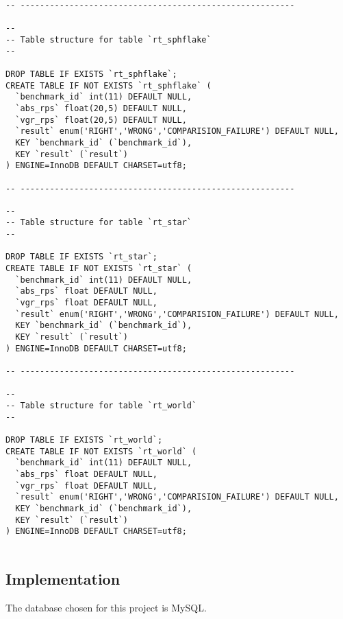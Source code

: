 \documentclass[a4paper,12pt, titlepage]{article}
\begin{document}
\begin{verbatim}
-- --------------------------------------------------------

--
-- Table structure for table `rt_sphflake`
--

DROP TABLE IF EXISTS `rt_sphflake`;
CREATE TABLE IF NOT EXISTS `rt_sphflake` (
  `benchmark_id` int(11) DEFAULT NULL,
  `abs_rps` float(20,5) DEFAULT NULL,
  `vgr_rps` float(20,5) DEFAULT NULL,
  `result` enum('RIGHT','WRONG','COMPARISION_FAILURE') DEFAULT NULL,
  KEY `benchmark_id` (`benchmark_id`),
  KEY `result` (`result`)
) ENGINE=InnoDB DEFAULT CHARSET=utf8;

-- --------------------------------------------------------

--
-- Table structure for table `rt_star`
--

DROP TABLE IF EXISTS `rt_star`;
CREATE TABLE IF NOT EXISTS `rt_star` (
  `benchmark_id` int(11) DEFAULT NULL,
  `abs_rps` float DEFAULT NULL,
  `vgr_rps` float DEFAULT NULL,
  `result` enum('RIGHT','WRONG','COMPARISION_FAILURE') DEFAULT NULL,
  KEY `benchmark_id` (`benchmark_id`),
  KEY `result` (`result`)
) ENGINE=InnoDB DEFAULT CHARSET=utf8;

-- --------------------------------------------------------

--
-- Table structure for table `rt_world`
--

DROP TABLE IF EXISTS `rt_world`;
CREATE TABLE IF NOT EXISTS `rt_world` (
  `benchmark_id` int(11) DEFAULT NULL,
  `abs_rps` float DEFAULT NULL,
  `vgr_rps` float DEFAULT NULL,
  `result` enum('RIGHT','WRONG','COMPARISION_FAILURE') DEFAULT NULL,
  KEY `benchmark_id` (`benchmark_id`),
  KEY `result` (`result`)
) ENGINE=InnoDB DEFAULT CHARSET=utf8;


\end{verbatim}


\subsection{Implementation}
The database chosen for this project is MySQL.
\end{document}
